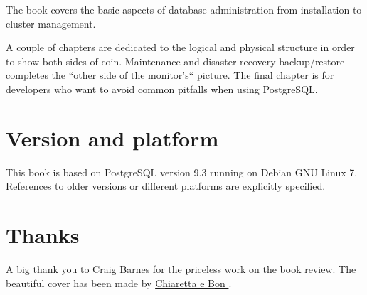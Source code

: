\documentclass[oneside]{book}
\begin{document}
The book covers the basic aspects of database administration from installation
to cluster management.

A couple of chapters are dedicated to the logical and physical structure in
order to show both sides of coin.  Maintenance and disaster recovery
backup/restore completes the ``other side of the monitor's`` picture.
The final chapter is for developers who want to avoid common pitfalls when
using PostgreSQL.

\section*{Version and platform}
This book is based on PostgreSQL version 9.3 running on Debian GNU Linux 7.
References to older versions or different platforms are explicitly specified.

\section*{Thanks}
A big thank you to Craig Barnes for the priceless work on the book review.\newline
The beautiful cover has been made by \href{http://www.bonland.eu/}{
Chiaretta e Bon }.\newline














\appendix

\listoffigures
\listoftables
\printindex{}
\end{document}
